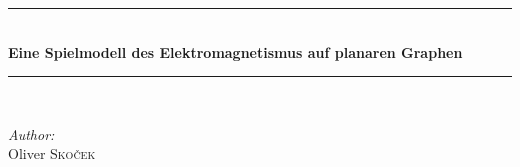 \documentclass[11pt,a4paper,leqno]{report}
\numberwithin{equation}{chapter}
\renewcommand{\contentsname}{Inhaltsverzeichnis}
\begin{document}
\begin{titlepage}

\vspace*{5cm}
\begin{center}
\rule{\linewidth}{0.5mm} \\[0.4cm]
{ \Huge \bfseries Eine Spielmodell des Elektromagnetismus auf planaren Graphen} \\[0.2cm]
\rule{\linewidth}{0.5mm} \\[3.5cm]
\begin{minipage}[t]{0.4\textwidth}
\begin{flushleft} \large
\emph{Author:}\\
Oliver \textsc{Sko\v{c}ek} \\[4cm]
\small

\end{flushleft}

\end{minipage}
\begin{minipage}[t]{0.4\textwidth}

\end{minipage}
 

 
\end{center}
 
\end{titlepage}




\tableofcontents


\vfill
\end{document}
